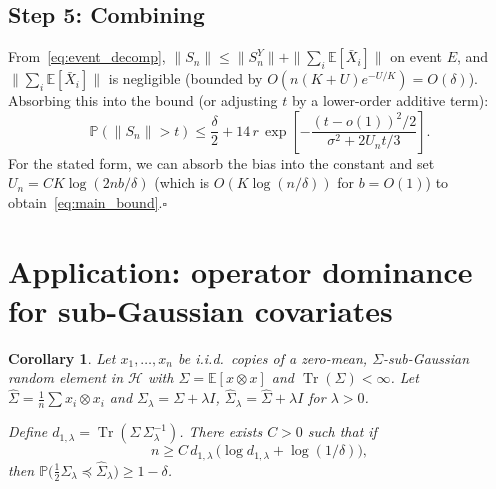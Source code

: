 \documentclass[11pt]{article}
\newtheorem{corollary}[theorem]{Corollary}
\DeclareMathOperator{\Tr}{Tr}
\newcommand{\E}{\mathbb{E}}
\newcommand{\PP}{\mathbb{P}}
\newcommand{\cH}{\mathcal{H}}
\newcommand{\norm}[1]{\|#1\|}
\begin{document}
\subsection*{Step 5: Combining}

From~\eqref{eq:event_decomp}, $\norm{S_n}\leq\norm{S_n^Y}+\norm{\sum_i\E[\bar X_i]}$ on event $E$, and $\norm{\sum_i\E[\bar X_i]}$ is negligible (bounded by $O(n(K+U)e^{-U/K})=O(\delta)$). Absorbing this into the bound (or adjusting $t$ by a lower-order additive term):
\[
\PP(\norm{S_n}>t)
\leq \frac{\delta}{2}+14\,r\,\exp\!\left[-\frac{(t-o(1))^2/2}{\sigma^2+2U_nt/3}\right].
\]
For the stated form, we can absorb the bias into the constant and set $U_n=CK\log(2nb/\delta)$ (which is $O(K\log(n/\delta))$ for $b=O(1)$) to obtain~\eqref{eq:main_bound}.\hfill$\square$

\section{Application: operator dominance for sub-Gaussian covariates}

\begin{corollary}\label{cor:dominance}
Let $x_1,\ldots,x_n$ be i.i.d.\ copies of a zero-mean, $\Sigma$-sub-Gaussian random element in $\cH$ with $\Sigma=\E[x\otimes x]$ and $\Tr(\Sigma)<\infty$. Let $\hat\Sigma=\frac{1}{n}\sum x_i\otimes x_i$ and $\Sigma_\lambda=\Sigma+\lambda I$, $\hat\Sigma_\lambda=\hat\Sigma+\lambda I$ for $\lambda>0$.

Define $d_{1,\lambda}=\Tr(\Sigma\,\Sigma_\lambda^{-1})$. There exists $C>0$ such that if
\[
n\geq C\,d_{1,\lambda}\,\bigl(\log d_{1,\lambda}+\log(1/\delta)\bigr),
\]
then $\PP\bigl(\tfrac{1}{2}\Sigma_\lambda\preceq\hat\Sigma_\lambda\bigr)\geq 1-\delta$.
\end{corollary}
\end{document}
